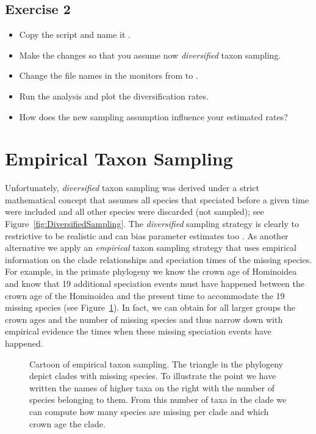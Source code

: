 \subsection{Exercise 2}

\begin{itemize}
\item Copy the \Rev script  and name it .
\item Make the changes so that you assume now \emph{diversified} taxon sampling.
\item Change the file names in the monitors from  to .
\item Run the analysis and plot the diversification rates.
\item How does the new sampling assumption influence your estimated rates?
\end{itemize}


\newpage
\section{Empirical Taxon Sampling}

Unfortunately, \emph{diversified} taxon sampling was derived under a strict mathematical concept that assumes all species that speciated before a given time were included and all other species were discarded (not sampled); see Figure~\ref{fig:DiversifiedSampling}.
The \emph{diversified} sampling strategy is clearly to restrictive to be realistic and can bias parameter estimates too \citep{Hoehna2014a}.
As another alternative we apply an \emph{empirical} taxon sampling strategy that uses empirical information on the clade relationships and speciation times of the missing species.
For example, in the primate phylogeny we know the crown age of Hominoidea and know that 19 additional speciation events must have happened between the crown age of the Hominoidea and the present time to accommodate the 19 missing species (see Figure~\ref{fig:EmpiricalSampling}).
In fact, we can obtain for all larger groups the crown ages and the number of missing species and thus narrow down with empirical evidence the times when these missing speciation events have happened.

\begin{figure}[h!]
\centering
{}
\caption{\small Cartoon of empirical taxon sampling. The triangle in the phylogeny depict clades with missing species. To illustrate the point we have written the names of higher taxa on the right with the number of species belonging to them. From this number of taxa in the clade we can compute how many species are missing per clade and which crown age the clade.}
\label{fig:EmpiricalSampling}
\end{figure}

